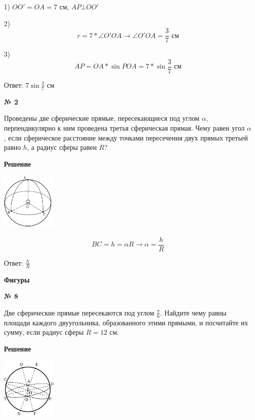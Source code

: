     1) $OO' = OA = 7$ см, $AP \bot OO'$

    2)
    \[
        r = 7*\angle O'OA \rightarrow \angle O'OA = \frac{3}{7} \text{ см}
    \]

    3)
    \[
        AP = OA * \sin POA = 7 * \sin \frac{3}{7} \text{ см}
    \]

    Ответ: $7\sin \frac{3}{7}$ см

    \begin{center}
        \textbf{№ 2}
    \end{center}

    Проведены две сферические прямые, пересекающиеся под углом $\alpha$,
    перпендикулярно к ним проведена третья сферическая прямая.
    Чему равен угол $\alpha$, если сферическое расстояние между точками пересечения
    двух прямых третьей равно $h$, а радиус сферы равен $R$?

    \textbf{Решение}\\

    \begin{center}
        \includegraphics[width=0.2\textwidth]{images/img44}\\
    \end{center}

    \[
        BC = h = \alpha R \rightarrow \alpha = \frac{h}{R}
    \]

    Ответ: $\frac{h}{R}$


    \begin{center}
        \textbf{Фигуры}
    \end{center}

    \begin{center}
        \textbf{№ 8}
    \end{center}
    Две сферические прямые пересекаются под углом $\frac{\pi}{6}$.
    Найдите чему равны площади каждого двуугольника, образованного этими прямыми, и посчитайте их сумму,
    если радиус сферы $R=12$ см.

    \textbf{Решение}\\

    \begin{center}
        \includegraphics[width=0.2\textwidth]{images/img3}\\
    \end{center}


